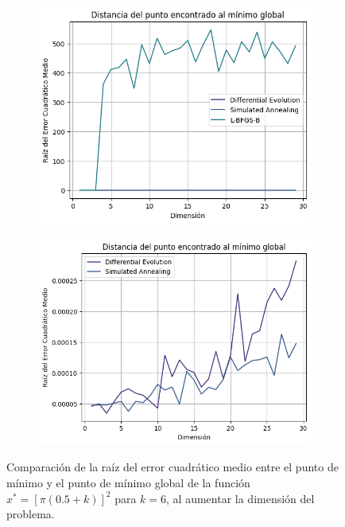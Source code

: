 \documentclass[10pt,a4paper,twocolumn]{article}
\begin{document}
			\begin{figure}[htb!]
			\centering
			\begin{subfigure}{.492\linewidth}
				\includegraphics[height=.95\linewidth, width=.95\linewidth]{assets/rmse_comp}
				\caption{}
				\label{fig:4a}
			\end{subfigure}
			\begin{subfigure}{.492\linewidth}
				\includegraphics[height=.95\linewidth, width=.95\linewidth]{assets/rmse_comp2}
				\caption{}
				\label{fig:4b}
			\end{subfigure}
			\caption{Comparación de la raíz del error cuadrático medio entre el punto de mínimo y el punto de mínimo global de la función $x^* = [ \pi (0.5 + k)]^2$ para $k=6$, al aumentar la dimensión del problema.}
			\label{fig:4}
		\end{figure}
	
\end{document}
